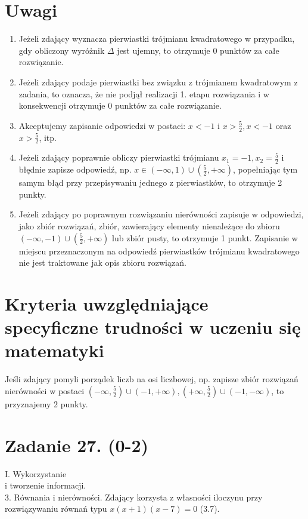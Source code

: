 \documentclass[10pt]{article}
\begin{document}
\section*{Uwagi}
\begin{enumerate}
  \item Jeżeli zdający wyznacza pierwiastki trójmianu kwadratowego w przypadku, gdy obliczony wyróżnik $\Delta$ jest ujemny, to otrzymuje 0 punktów za całe rozwiązanie.
  \item Jeżeli zdający podaje pierwiastki bez związku z trójmianem kwadratowym z zadania, to oznacza, że nie podjął realizacji 1. etapu rozwiązania i w konsekwencji otrzymuje 0 punktów za całe rozwiązanie.
  \item Akceptujemy zapisanie odpowiedzi w postaci: $x<-1$ i $x>\frac{5}{2}, x<-1$ oraz $x>\frac{5}{2}$, itp.
  \item Jeżeli zdający poprawnie obliczy pierwiastki trójmianu $x_{1}=-1, x_{2}=\frac{5}{2}$ i błędnie zapisze odpowiedź, np. $x \in(-\infty, 1) \cup\left(\frac{5}{2},+\infty\right)$, popełniając tym samym błąd przy przepisywaniu jednego z pierwiastków, to otrzymuje 2 punkty.
  \item Jeżeli zdający po poprawnym rozwiązaniu nierówności zapisuje w odpowiedzi, jako zbiór rozwiązań, zbiór, zawierający elementy nienależące do zbioru $(-\infty,-1) \cup\left(\frac{5}{2},+\infty\right)$ lub zbiór pusty, to otrzymuje 1 punkt. Zapisanie w miejscu przeznaczonym na odpowiedź pierwiastków trójmianu kwadratowego nie jest traktowane jak opis zbioru rozwiązań.
\end{enumerate}

\section*{Kryteria uwzględniające specyficzne trudności w uczeniu się matematyki}
Jeśli zdający pomyli porządek liczb na osi liczbowej, np. zapisze zbiór rozwiązań nierówności w postaci $\left(-\infty, \frac{5}{2}\right) \cup(-1,+\infty),\left(+\infty, \frac{5}{2}\right) \cup(-1,-\infty)$, to przyznajemy 2 punkty.

\section*{Zadanie 27. (0-2)}
I. Wykorzystanie\\
i tworzenie informacji.\\
3. Równania i nierówności. Zdający korzysta z własności iloczynu przy rozwiązywaniu równań typu $x(x+1)(x-7)=0$ (3.7).
\end{document}
